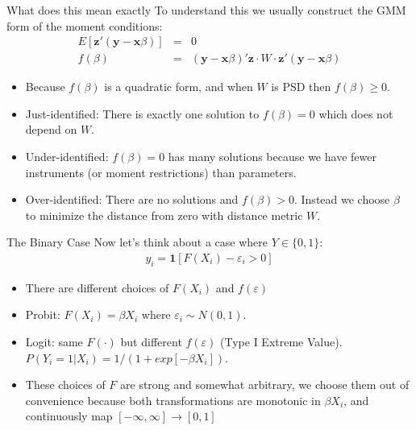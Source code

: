 \begin{frame}{What does this mean exactly}
To understand this we usually construct the GMM form of the moment conditions:
\begin{eqnarray*}
E[\mathbf{z}' (\mathbf{y} - \mathbf{x} \beta)] &=&0\\
f(\beta)&=&  (\mathbf{y} - \mathbf{x} \beta)' \mathbf{z} \cdot W \cdot \mathbf{z}' (\mathbf{y} - \mathbf{x} \beta)
\end{eqnarray*}
\begin{itemize}
\item Because $f(\beta)$ is a quadratic form, and when $W$ is PSD then $f(\beta) \geq 0$.
\item Just-identified: There is exactly one solution to $f(\beta) = 0$ which does not depend on $W$.
\item Under-identified: $f(\beta) = 0$ has many solutions because we have fewer instruments (or moment restrictions) than parameters.
\item Over-identified: There are no solutions and $f(\beta) > 0$. Instead we choose $\beta$ to minimize the distance from zero with distance metric $W$.
\end{itemize}
\end{frame}

\begin{frame}{The Binary Case}
Now let's think about a case where $Y \in \{0,1\}$:
\begin{eqnarray*}
y_i = \mathbf{1}[F(X_i) - \varepsilon_i > 0]
\end{eqnarray*}
\begin{itemize}
\item There are different choices of $F(X_i)$ and $f(\varepsilon)$
\item  Probit: $F(X_i) = \beta X_i$ where $\varepsilon_i \sim N(0,1)$.
\item  Logit: same $F(\cdot)$ but different $f(\varepsilon)$ (Type I Extreme Value). $P(Y_i = 1 | X_i) = 1/(1+exp[-\beta X_i])$.
\item These choices of $F$ are strong and somewhat arbitrary, we choose them out of convenience because both transformations are monotonic in $\beta X_i$, and continuously map $[-\infty,\infty] \rightarrow [0,1]$
\end{itemize}
\end{frame}


